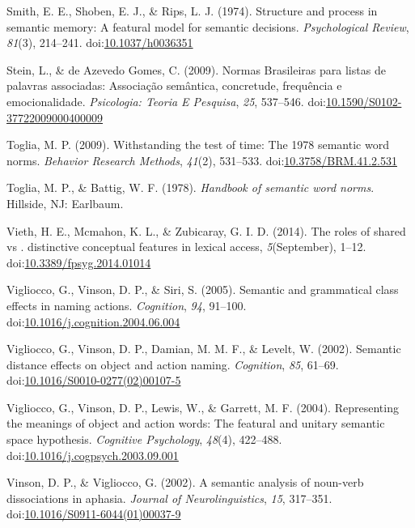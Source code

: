 \documentclass[english,,man]{apa6}
\theoremstyle{definition}
\theoremstyle{definition}
\theoremstyle{definition}
\theoremstyle{remark}
\begin{document}
\hypertarget{ref-Smith1974}{}
Smith, E. E., Shoben, E. J., \& Rips, L. J. (1974). Structure and
process in semantic memory: A featural model for semantic decisions.
\emph{Psychological Review}, \emph{81}(3), 214--241.
doi:\href{https://doi.org/10.1037/h0036351}{10.1037/h0036351}

\hypertarget{ref-Stein2009}{}
Stein, L., \& de Azevedo Gomes, C. (2009). Normas Brasileiras para
listas de palavras associadas: Associação semântica, concretude,
frequência e emocionalidade. \emph{Psicologia: Teoria E Pesquisa},
\emph{25}, 537--546.
doi:\href{https://doi.org/10.1590/S0102-37722009000400009}{10.1590/S0102-37722009000400009}

\hypertarget{ref-Toglia2009}{}
Toglia, M. P. (2009). Withstanding the test of time: The 1978 semantic
word norms. \emph{Behavior Research Methods}, \emph{41}(2), 531--533.
doi:\href{https://doi.org/10.3758/BRM.41.2.531}{10.3758/BRM.41.2.531}

\hypertarget{ref-Toglia1978}{}
Toglia, M. P., \& Battig, W. F. (1978). \emph{Handbook of semantic word
norms}. Hillside, NJ: Earlbaum.

\hypertarget{ref-Vieth2014}{}
Vieth, H. E., Mcmahon, K. L., \& Zubicaray, G. I. D. (2014). The roles
of shared vs . distinctive conceptual features in lexical access,
\emph{5}(September), 1--12.
doi:\href{https://doi.org/10.3389/fpsyg.2014.01014}{10.3389/fpsyg.2014.01014}

\hypertarget{ref-Vigliocco2005}{}
Vigliocco, G., Vinson, D. P., \& Siri, S. (2005). Semantic and
grammatical class effects in naming actions. \emph{Cognition},
\emph{94}, 91--100.
doi:\href{https://doi.org/10.1016/j.cognition.2004.06.004}{10.1016/j.cognition.2004.06.004}

\hypertarget{ref-Vigliocco2002}{}
Vigliocco, G., Vinson, D. P., Damian, M. M. F., \& Levelt, W. (2002).
Semantic distance effects on object and action naming. \emph{Cognition},
\emph{85}, 61--69.
doi:\href{https://doi.org/10.1016/S0010-0277(02)00107-5}{10.1016/S0010-0277(02)00107-5}

\hypertarget{ref-Vigliocco2004}{}
Vigliocco, G., Vinson, D. P., Lewis, W., \& Garrett, M. F. (2004).
Representing the meanings of object and action words: The featural and
unitary semantic space hypothesis. \emph{Cognitive Psychology},
\emph{48}(4), 422--488.
doi:\href{https://doi.org/10.1016/j.cogpsych.2003.09.001}{10.1016/j.cogpsych.2003.09.001}

\hypertarget{ref-Vinson2002}{}
Vinson, D. P., \& Vigliocco, G. (2002). A semantic analysis of noun-verb
dissociations in aphasia. \emph{Journal of Neurolinguistics}, \emph{15},
317--351.
doi:\href{https://doi.org/10.1016/S0911-6044(01)00037-9}{10.1016/S0911-6044(01)00037-9}
\end{document}
